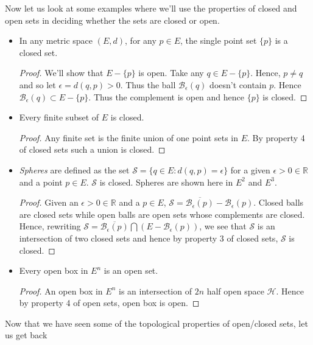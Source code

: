Now let us look at some examples where we'll use the properties of closed and open sets in 
deciding whether the sets are closed or open.
\begin{itemize}
    \item In any metric space $(E,d)$, for any $p \in E$, the single point set $\lbrace p \rbrace$
	is a closed set.
	\begin{proof}
	    We'll show that $E - \lbrace p \rbrace$ is open. Take any $q \in E - \lbrace p \rbrace$.
	    Hence, $p \neq q$ and so let $\epsilon = d(q,p) > 0$. Thus the ball
	    $\mathcal{B}_{\epsilon}(q)$ doesn't contain $p$. Hence $\mathcal{B}_{\epsilon}(q)
	    \subset E - \lbrace p \rbrace$. Thus the complement is open and hence $\lbrace p
	    \rbrace$ is closed.
	\end{proof}
    \item Every finite subset of $E$ is closed.
	\begin{proof}
	    Any finite set is the finite union of one point sets in $E$. By property 4 of closed
	    sets such a union is closed.
	\end{proof}
    \item \emph{Spheres} are defined as the set $\mathcal{S} = \left.\lbrace q \in E : d(q,p) =
	    \epsilon \rbrace\right.$ for a given $\epsilon > 0 \in \mathbb{R}$ and 
	    a point $p \in E$. $\mathcal{S}$ is closed. Spheres are shown here in $E^2$ and $E^3$.
	    
	\begin{proof}
	    Given an $\epsilon > 0 \in \mathbb{R}$ and a $p \in E$, $\mathcal{S} =
	    \overline{\mathcal{B}_{\epsilon}(p)} - \mathcal{B}_{\epsilon}(p)$. Closed balls are
	    closed sets while open balls are open sets whose complements are closed. Hence,
	    rewriting $\mathcal{S} = \overline{\mathcal{B}_{\epsilon}(p)} \bigcap \left( E - 
		\mathcal{B}_{\epsilon}(p) \right)$, we see that $\mathcal{S}$ is an intersection
	    of two closed sets and hence by property 3 of closed sets, $\mathcal{S}$ is closed.	       
	\end{proof}
    \item Every open box in $E^n$ is an open set.
	\begin{proof}
	    An open box in $E^n$ is an intersection of $2n$ half open space $\mathcal{H}$. Hence by
	    property 4 of open sets, open box is open.
	\end{proof}
\end{itemize}
Now that we have seen some of the topological properties of open/closed sets, let us get back
